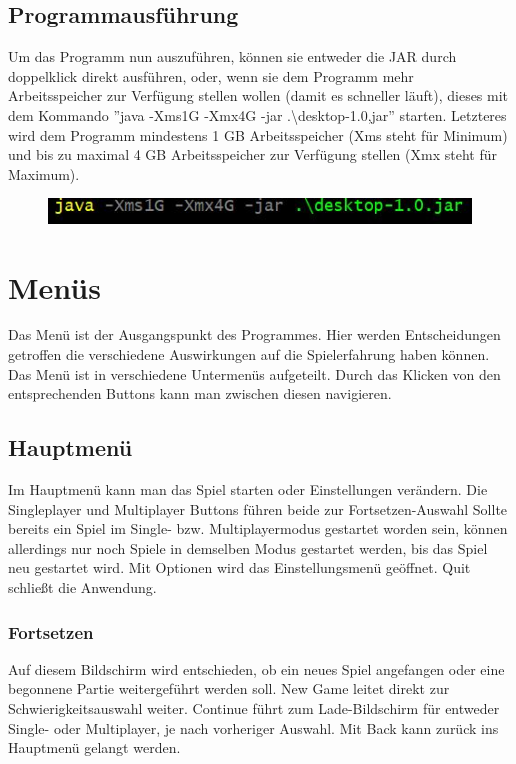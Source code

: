 \documentclass[fontsize=12pt,paper=a4,twoside]{scrartcl}
\begin{document}

\subsection{Programmausführung}

Um das Programm nun auszuführen, können sie entweder die JAR durch doppelklick direkt ausführen, oder, wenn sie dem Programm mehr Arbeitsspeicher zur Verfügung stellen wollen (damit es schneller läuft), dieses mit dem Kommando ''java -Xms1G -Xmx4G -jar .\textbackslash desktop-1.0,jar'' starten. Letzteres wird dem Programm mindestens 1 GB Arbeitsspeicher  (Xms steht für Minimum) und bis zu maximal 4 GB Arbeitsspeicher zur Verfügung stellen (Xmx steht für Maximum).

\begin{figure}[h!]
\centering
\includegraphics[width=0.8\linewidth]{run_application.JPG}
\end{figure} 

\newpage
\section{Menüs}
Das Menü ist der Ausgangspunkt des Programmes. Hier werden Entscheidungen getroffen die verschiedene Auswirkungen auf die Spielerfahrung haben können.
Das Menü ist in verschiedene Untermenüs aufgeteilt. Durch das Klicken von den entsprechenden Buttons kann man zwischen diesen navigieren.

\subsection{Hauptmenü}
Im Hauptmenü kann man das Spiel starten oder Einstellungen verändern. Die Singleplayer und Multiplayer Buttons führen beide zur Fortsetzen-Auswahl
Sollte bereits ein Spiel im Single- bzw. Multiplayermodus gestartet worden sein, können allerdings nur noch Spiele in demselben Modus gestartet werden, bis das Spiel neu gestartet wird.
Mit Optionen wird das Einstellungsmenü geöffnet.
Quit schließt die Anwendung.

\subsubsection{Fortsetzen}
Auf diesem Bildschirm wird entschieden, ob ein neues Spiel angefangen oder eine begonnene Partie weitergeführt werden soll. New Game leitet direkt zur Schwierigkeitsauswahl weiter. Continue führt zum Lade-Bildschirm für entweder Single- oder Multiplayer, je nach vorheriger Auswahl.
Mit Back kann zurück ins Hauptmenü gelangt werden.
\end{document}
